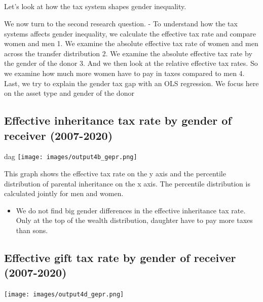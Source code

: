 \documentclass[
  letterpaper,
  DIV=11,
  numbers=noendperiod]{scrartcl}
\providecommand{\tightlist}{%
  \setlength{\itemsep}{0pt}\setlength{\parskip}{0pt}}\usepackage{longtable,booktabs,array}
\begin{document}
\hypertarget{section-1}{%
\subsection{}\label{section-1}}

{Let's look at how the tax system shapes gender inequality.}

We now turn to the second research question. - To understand how the tax
systems affects gender inequality, we calculate the effective tax rate
and compare women and men 1. We examine the absolute effective tax rate
of women and men across the transfer distribution 2. We examine the
absolute effective tax rate by the gender of the donor 3. And we then
look at the relative effective tax rates. So we examine how much more
women have to pay in taxes compared to men 4. Last, we try to explain
the gender tax gap with an OLS regression. We focus here on the asset
type and gender of the donor

\hypertarget{effective-inheritance-tax-rate-by-gender-of-receiver-2007-2020}{%
\subsection{Effective inheritance tax rate by gender of receiver
(2007-2020)}\label{effective-inheritance-tax-rate-by-gender-of-receiver-2007-2020}}

dag
\texttt{[image: images/output4b\_gepr.png]}

This graph shows the effective tax rate on the y axis and the percentile
distribution of parental inheritance on the x axis. The percentile
distribution is calculated jointly for men and women.

\begin{itemize}
\tightlist
\item
  We do not find big gender differences in the effective inheritance tax
  rate. Only at the top of the wealth distribution, daughter have to pay
  more taxes than sons.
\end{itemize}

\hypertarget{effective-gift-tax-rate-by-gender-of-receiver-2007-2020}{%
\subsection{Effective gift tax rate by gender of receiver
(2007-2020)}\label{effective-gift-tax-rate-by-gender-of-receiver-2007-2020}}

\texttt{[image: images/output4d\_gepr.png]}
\end{document}
